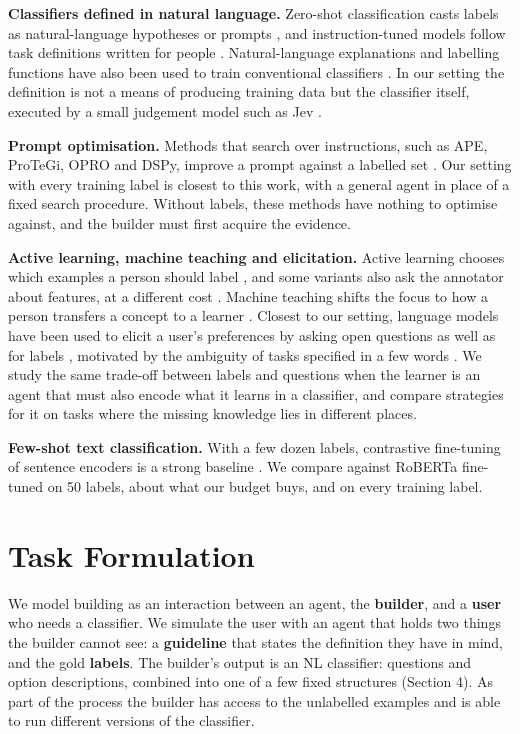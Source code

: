 \documentclass[11pt]{article}
\begin{document}
\textbf{Classifiers defined in natural language.} Zero-shot classification casts labels as natural-language hypotheses or prompts \citep{yin2019benchmarking,schick2021exploiting}, and instruction-tuned models follow task definitions written for people \citep{mishra2022cross}. Natural-language explanations and labelling functions have also been used to train conventional classifiers \citep{hancock2018training,ratner2017snorkel}. In our setting the definition is not a means of producing training data but the classifier itself, executed by a small judgement model such as Jev \citep{typesafe2026}.

\textbf{Prompt optimisation.} Methods that search over instructions, such as APE, ProTeGi, OPRO and DSPy, improve a prompt against a labelled set \citep{zhou2023ape,pryzant2023automatic,yang2024opro,khattab2024dspy}. Our setting with every training label is closest to this work, with a general agent in place of a fixed search procedure. Without labels, these methods have nothing to optimise against, and the builder must first acquire the evidence.

\textbf{Active learning, machine teaching and elicitation.} Active learning chooses which examples a person should label \citep{settles2009active}, and some variants also ask the annotator about features, at a different cost \citep{raghavan2006active,druck2009active}. Machine teaching shifts the focus to how a person transfers a concept to a learner \citep{simard2017machine}. Closest to our setting, language models have been used to elicit a user's preferences by asking open questions as well as for labels \citep{li2023eliciting}, motivated by the ambiguity of tasks specified in a few words \citep{tamkin2023task}. We study the same trade-off between labels and questions when the learner is an agent that must also encode what it learns in a classifier, and compare strategies for it on tasks where the missing knowledge lies in different places.

\textbf{Few-shot text classification.} With a few dozen labels, contrastive fine-tuning of sentence encoders is a strong baseline \citep{tunstall2022setfit}. We compare against RoBERTa \citep{liu2019roberta} fine-tuned on 50 labels, about what our budget buys, and on every training label.

\section{Task Formulation}

We model building as an interaction between an agent, the \textbf{builder}, and a \textbf{user} who needs a classifier. We simulate the user with an agent that holds two things the builder cannot see: a \textbf{guideline} that states the definition they have in mind, and the gold \textbf{labels}. The builder's output is an NL classifier: questions and option descriptions, combined into one of a few fixed structures (Section 4). As part of the process the builder has access to the unlabelled examples and is able to run different versions of the classifier.
\end{document}
